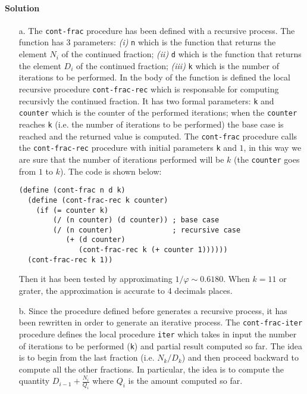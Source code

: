 \paragraph{Solution}
\begin{itemize}
    \item[a.] The \texttt{cont-frac} procedure has been defined with a recursive process. The function has 3 parameters: \textit{(i)}
        \texttt{n} which is the function that returns the element $ N_{i} $ of the continued fraction; \textit{(ii)} \texttt{d}
        which is the function that returns the element $ D_{i} $ of the continued fraction; \textit{(iii)} \texttt{k} which is the
        number of iterations to be performed.
        In the body of the function is defined the local recursive procedure \texttt{cont-frac-rec} which is responsable for
        computing recursivly the continued fraction. It has two formal parameters: \texttt{k} and \texttt{counter} which is the 
        counter of the performed iterations; when the \texttt{counter} reaches \texttt{k} (i.e. the number of iterations to be
        performed) the base case is reached and the returned value is computed.
        The \texttt{cont-frac} procedure calls the \texttt{cont-frac-rec} procedure with initial parameters \texttt{k} and $1$,
        in this way we are sure that the number of iterations performed will be $k$ (the \texttt{counter} goes from $1$ to $k$).
        The code is shown below:
\begin{lstlisting}[caption={Recursive \texttt{cont-frac} procedure},captionpos=b]
(define (cont-frac n d k)
  (define (cont-frac-rec k counter) 
    (if (= counter k)
        (/ (n counter) (d counter)) ; base case
        (/ (n counter)              ; recursive case
           (+ (d counter) 
              (cont-frac-rec k (+ counter 1))))))
  (cont-frac-rec k 1))
\end{lstlisting}
        Then it has been tested by approximating $ 1 / \varphi \sim 0.6180 $. When $ k = 11 $ or grater, the approximation is
        accurate to 4 decimals places.
    \item[b.] Since the procedure defined before generates a recursive process, it has been rewritten in order to generate an iterative
        process. The \texttt{cont-frac-iter} procedure defines the local procedure \texttt{iter} which takes in input the number of
        iterations to be performed (\texttt{k}) and partial result computed so far. The idea is to begin from the last fraction (i.e. 
        $ N_{k} / D_{k} $) and then proceed backward to compute all the other fractions. In particular, the idea is to compute
        the quantity $ D_{i - 1} + \frac{N_{i}}{Q_{i}} $ where $ Q_{i} $ is the amount computed so far.
        

\end{itemize}
